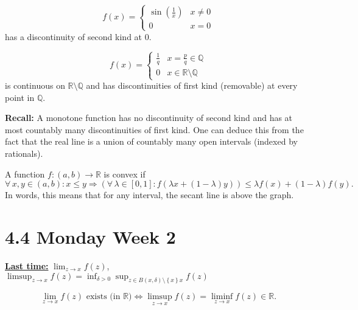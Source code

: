 \documentclass{notes}
\begin{document}
  \begin{eg}
    \begin{equation}
      f(x) = \begin{cases}
        \sin \left ( \frac{1}{x} \right ) & x \neq 0 \\ 
        0 & x = 0
      \end{cases}
    \end{equation}
    has a discontinuity of second kind at 0.
  \end{eg}
  
  \begin{eg}
    \begin{equation}
      f(x) = \begin{cases}
        \frac{1}{q} & x = \frac{p}{q} \in \mathbb Q \\ 
        0 & x \in \mathbb R \setminus \mathbb Q
      \end{cases}
    \end{equation}
    is continuous on $\mathbb R \setminus \mathbb Q$ and has discontinuities of first kind (removable) at every point in $\mathbb Q$.
  \end{eg}
  
  {\boldmath \bfseries Recall:} A monotone function has no discontinuity of second kind and has at most countably many discontinuities of first kind.
  One can deduce this from the fact that the real line is a union of countably many open intervals (indexed by rationals).
  
  \begin{defn}
    A function $f \colon (a, b) \to \mathbb R$ is convex if 
    \[
      \forall \, x, y \in (a, b): x \leq y \Rightarrow (\forall \, \lambda \in [0, 1]: f(\lambda x + (1 - \lambda) y)) \leq \lambda f(x) + (1 - \lambda) f(y).
    \]
    In words, this means that for any interval, the secant line is above the graph.
  \end{defn}
  
  \section{4.4 Monday Week 2}
  
  \underline{\boldmath \bfseries Last time:} $\lim_{z \to x} f(z)$, $\limsup_{z \to x} f(z) = \inf_{\delta > 0} \sup_{z \in B(x, \delta) \setminus \left \{ x \right \}x} f(z)$
  
  \begin{lem}
    \[
      \lim_{z \to x} f(z) \text{ exists (in $\mathbb R$)} \Leftrightarrow \limsup_{z \to x} f(z) = \liminf_{z \to x} f(z) \in \mathbb R.
    \]
  \end{lem}
  
\end{document}
